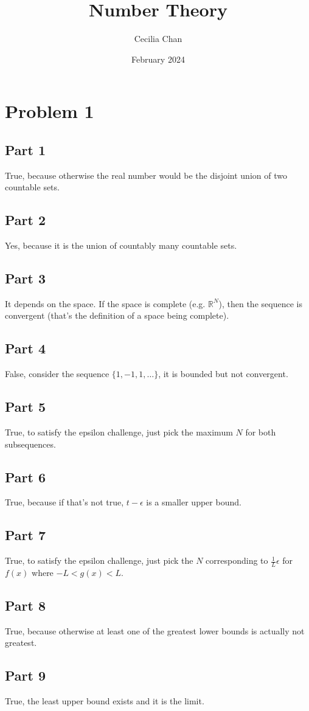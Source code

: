 \documentclass{article}
\title{Number Theory}
\author{Cecilia Chan}
\date{February 2024}
\begin{document}
\section*{Problem 1}
\subsection*{Part 1}
True, because otherwise the real number would be the disjoint union of two countable sets.
\subsection*{Part 2}
Yes, because it is the union of countably many countable sets.
\subsection*{Part 3}
It depends on the space. If the space is complete (e.g. $ \mathbb{R}^N $), then the sequence is convergent (that's the definition of a space being complete).
\subsection*{Part 4}
False, consider the sequence $ \{1, -1, 1, \ldots \} $, it is bounded but not convergent.
\subsection*{Part 5}
True, to satisfy the epsilon challenge, just pick the maximum $ N $ for both subsequences.
\subsection*{Part 6}
True, because if that's not true, $ t - \epsilon $ is a smaller upper bound.
\subsection*{Part 7}
True, to satisfy the epsilon challenge, just pick the $ N $ corresponding to $ \frac{1}{L} \epsilon $ for $ f(x) $ where $ -L < g(x) < L$.
\subsection*{Part 8}
True, because otherwise at least one of the greatest lower bounds is actually not greatest.
\subsection*{Part 9}
True, the least upper bound exists and it is the limit.
\end{document}

